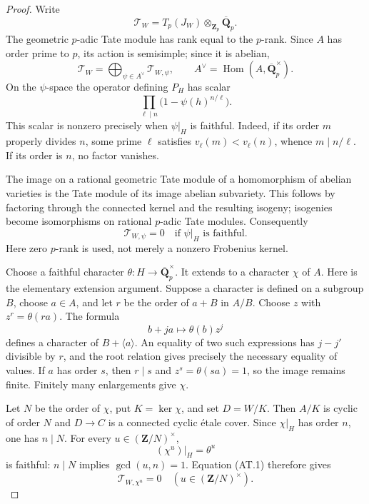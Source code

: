 \begin{proof}
Write
\[
 \mathcal T_W=T_p(J_W)\otimes_{\mathbf Z_p}
                              \overline{\mathbf Q}_p.
\]
The geometric $p$-adic Tate module has rank equal
to the $p$-rank. Since $A$ has order prime to $p$,
its action is semisimple; since it is abelian,
\[
 \mathcal T_W=\bigoplus_{\psi\in A^\vee}\mathcal T_{W,\psi},
 \qquad
 A^\vee=\operatorname{Hom}(A,\overline{\mathbf Q}_p^\times).
\]
On the $\psi$-space the operator defining $P_H$
has scalar
\[
              \prod_{\ell\mid n}
                   \bigl(1-\psi(h)^{n/\ell}\bigr).
\]
This scalar is nonzero precisely when $\psi|_H$
is faithful. Indeed, if its order $m$ properly
divides $n$, some prime $\ell$ satisfies
$v_\ell(m)<v_\ell(n)$, whence $m\mid n/\ell$.
If its order is $n$, no factor vanishes.

The image on a rational geometric Tate module of
a homomorphism of abelian varieties is the Tate
module of its image abelian subvariety. This
follows by factoring through the connected
kernel and the resulting isogeny; isogenies
become isomorphisms on rational $p$-adic Tate
modules. Consequently
\[
 \mathcal T_{W,\psi}=0
          \quad\text{if }\psi|_H\text{ is faithful}.
                                                        \tag{AT.1}
\]
Here zero $p$-rank is used, not merely a
nonzero Frobenius kernel.

Choose a faithful character
$\theta:H\to\overline{\mathbf Q}_p^\times$.
It extends to a character $\chi$ of $A$.
Here is the elementary extension argument.
Suppose a character is defined on a subgroup $B$,
choose $a\in A$, and let $r$ be the order of
$a+B$ in $A/B$. Choose $z$ with
$z^r=\theta(ra)$. The formula
\[
               b+ja\longmapsto\theta(b)z^j
\]
defines a character of $B+\langle a\rangle$.
An equality of two such expressions has
$j-j'$ divisible by $r$, and the root relation
gives precisely the necessary equality of
values. If $a$ has order $s$, then $r\mid s$
and $z^s=\theta(sa)=1$, so the image remains
finite. Finitely many enlargements give $\chi$.

Let $N$ be the order of $\chi$, put
$K=\ker\chi$, and set $D=W/K$.
Then $A/K$ is cyclic of order $N$ and
$D\to C$ is a connected cyclic \'{e}tale cover.
Since $\chi|_H$ has order $n$, one has $n\mid N$.
For every $u\in(\mathbf Z/N)^\times$,
\[
                    (\chi^u)|_H=\theta^u
\]
is faithful: $n\mid N$ implies $\gcd(u,n)=1$.
Equation (AT.1) therefore gives
\[
       \mathcal T_{W,\chi^u}=0
                 \quad(u\in(\mathbf Z/N)^\times).
                                                        \tag{AT.2}
\]


\end{proof}
